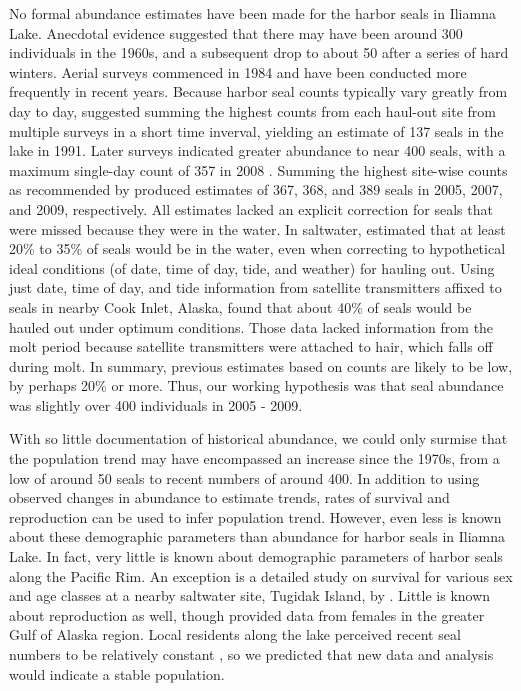 \documentclass[12pt, titlepage]{article}\usepackage[]{graphicx}\usepackage[]{color}
\begin{document}
No formal abundance estimates have been made for the harbor seals in Iliamna Lake.  Anecdotal evidence \citep{Burn:unpu:1978} suggested that there may have been around 300 individuals in the 1960s, and a subsequent drop to about 50 after a series of hard winters.  Aerial surveys commenced in 1984 and have been conducted more frequently in recent years. Because harbor seal counts typically vary greatly from day to day, \citet{Math:Klin:harb:1992} suggested summing the highest counts from each haul-out site from multiple surveys in a short time inverval, yielding an estimate of 137 seals in the lake in 1991. Later surveys indicated greater abundance to near 400 seals, with a maximum single-day count of 357 in 2008 \citep{ABR:wild:2011}. Summing the highest site-wise counts as recommended by \citet{Math:Klin:harb:1992} produced estimates of 367, 368, and 389 seals in 2005, 2007, and 2009, respectively.  All estimates lacked an explicit correction for seals that were missed because they were in the water. In saltwater, \citet{Simp:With:Cesa:Bove:stab:2003} estimated that at least 20\% to 35\% of seals would be in the water, even when correcting to hypothetical ideal conditions (of date, time of day, tide, and weather) for hauling out. Using just date, time of day, and tide information from satellite transmitters affixed to seals in nearby Cook Inlet, Alaska, \citet{Ver:Lond:Bove:fast:2010} found that about 40\% of seals would be hauled out under optimum conditions. Those data lacked information from the molt period because satellite transmitters were attached to hair, which falls off during molt.  In summary, previous estimates based on counts are likely to be low, by perhaps 20\% or more.  Thus, our working hypothesis was that seal abundance was slightly over 400 individuals in 2005 - 2009.

With so little documentation of historical abundance, we could only surmise that the population trend may have encompassed an increase since the 1970s, from a low of around 50 seals to recent numbers of around 400. In addition to using observed changes in abundance to estimate trends, rates of survival and reproduction can be used to infer population trend.  However, even less is known about these demographic parameters than abundance for harbor seals in Iliamna Lake.  In fact, very little is known about demographic parameters of harbor seals along the Pacific Rim.  An exception is a detailed study on survival for various sex and age classes at a nearby saltwater site, Tugidak Island, by \citet{Hast:Smal:Pend:sex:2012}.  Little is known about reproduction as well, though \citet{Pitc:Calk:biol:1979} provided data from females in the greater Gulf of Alaska region. Local residents along the lake perceived recent seal numbers to be relatively constant \citep{Burn:Van:With:Hole:Asko:inte:2016}, so we predicted that new data and analysis would indicate a stable population.
\end{document}
